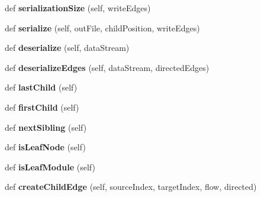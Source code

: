 \begin{DoxyCompactItemize}
\mbox{\label{classinfomapfolder_1_1infomap_1_1LeafIterator_a7bc08a9eb38a7191b6569e784089a402}} 
def {\bfseries serialization\+Size} (self, write\+Edges)
\item 
\mbox{\label{classinfomapfolder_1_1infomap_1_1LeafIterator_aebd0dadb016566fa469af6adcbf60603}} 
def {\bfseries serialize} (self, out\+File, child\+Position, write\+Edges)
\item 
\mbox{\label{classinfomapfolder_1_1infomap_1_1LeafIterator_a886e491ff04b2a3cf1cf925a5b32afb6}} 
def {\bfseries deserialize} (self, data\+Stream)
\item 
\mbox{\label{classinfomapfolder_1_1infomap_1_1LeafIterator_ab94078b13d4ae62bab1ccf851f5cbc75}} 
def {\bfseries deserialize\+Edges} (self, data\+Stream, directed\+Edges)
\item 
\mbox{\label{classinfomapfolder_1_1infomap_1_1LeafIterator_a80731fe14128040148819a901e8cd4e7}} 
def {\bfseries last\+Child} (self)
\item 
\mbox{\label{classinfomapfolder_1_1infomap_1_1LeafIterator_a6fdf0b129f8483a69a3fe280f1208b09}} 
def {\bfseries first\+Child} (self)
\item 
\mbox{\label{classinfomapfolder_1_1infomap_1_1LeafIterator_a8bc9e0a9d458349dbf0e3939f07aee60}} 
def {\bfseries next\+Sibling} (self)
\item 
\mbox{\label{classinfomapfolder_1_1infomap_1_1LeafIterator_a81627ec158d4b44fabc4e58407f53bd1}} 
def {\bfseries is\+Leaf\+Node} (self)
\item 
\mbox{\label{classinfomapfolder_1_1infomap_1_1LeafIterator_ae2b23f2582eaa55c41dd4ef344c18ba7}} 
def {\bfseries is\+Leaf\+Module} (self)
\item 
\mbox{\label{classinfomapfolder_1_1infomap_1_1LeafIterator_ab611adbf85612bfc758e29de54cd525d}} 
def {\bfseries create\+Child\+Edge} (self, source\+Index, target\+Index, flow, directed)
\end{DoxyCompactItemize}
